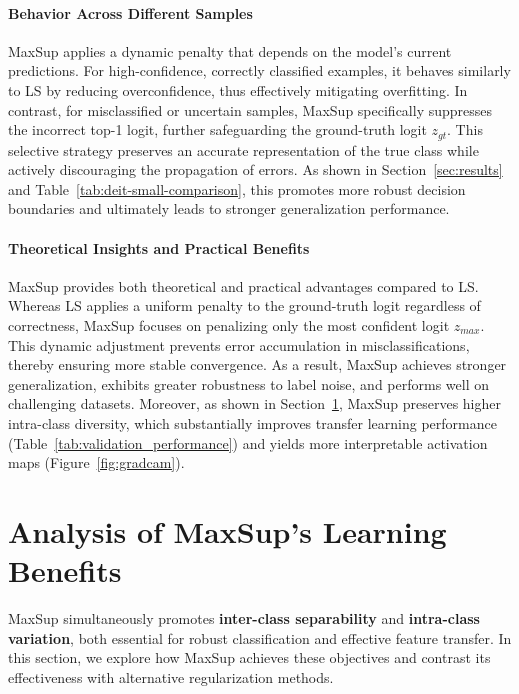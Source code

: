 \paragraph{Behavior Across Different Samples}  
MaxSup applies a dynamic penalty that depends on the model’s current predictions. For high-confidence, correctly classified examples, it behaves similarly to LS by reducing overconfidence, thus effectively mitigating overfitting. In contrast, for misclassified or uncertain samples, MaxSup specifically suppresses the incorrect top-1 logit, further safeguarding the ground-truth logit \(z_{gt}\). This selective strategy preserves an accurate representation of the true class while actively discouraging the propagation of errors. As shown in Section~\ref{sec:results} and Table~\ref{tab:deit-small-comparison}, this promotes more robust decision boundaries and ultimately leads to stronger generalization performance.

\paragraph{Theoretical Insights and Practical Benefits}
MaxSup provides both theoretical and practical advantages compared to LS. Whereas LS applies a uniform penalty to the ground-truth logit regardless of correctness, MaxSup focuses on penalizing only the most confident logit \(z_{\textit{max}}\). This dynamic adjustment prevents error accumulation in misclassifications, thereby ensuring more stable convergence. As a result, MaxSup achieves stronger generalization, exhibits greater robustness to label noise, and performs well on challenging datasets. Moreover, as shown in Section~\ref{sec:feature}, MaxSup preserves higher intra-class diversity, which substantially improves transfer learning performance (Table~\ref{tab:validation_performance}) and yields more interpretable activation maps (Figure~\ref{fig:gradcam}).


\section{Analysis of MaxSup's Learning Benefits}
\label{sec:feature}
MaxSup simultaneously promotes \textbf{inter-class separability} and \textbf{intra-class variation}, both essential for robust classification and effective feature transfer. In this section, we explore how MaxSup achieves these objectives and contrast its effectiveness with alternative regularization methods.

